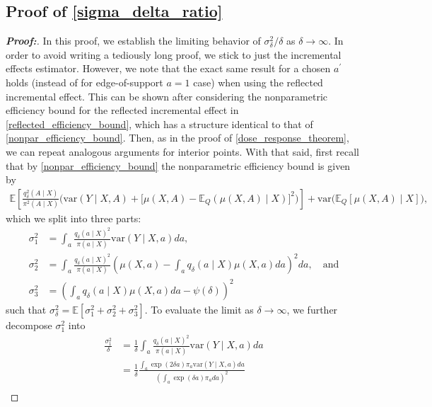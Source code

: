 \documentclass[11pt,twoside]{article}
\newcommand{\var}{\text{var}}
\theoremstyle{definition}
\theoremstyle{remark}
\begin{document}
\subsection{Proof of \texorpdfstring{\cref{sigma_delta_ratio}}{Corollary 1}} \label{sigma_delta_ratio_proof}
\begin{proof}[\textbf{Proof:}]
In this proof, we establish the limiting behavior of $\sigma^2_\delta / \delta$ as $\delta \to \infty$. In order to avoid writing a tediously long proof, we stick to just the incremental effects estimator. However, we note that the exact same result for a chosen $a^\prime$ holds (instead of for edge-of-support $a = 1$ case) when using the reflected incremental effect. This can be shown after considering the nonparametric efficiency bound for the reflected incremental effect in \cref{reflected_efficiency_bound}, which has a structure identical to that of \cref{nonpar_efficiency_bound}. Then, as in the proof of \cref{dose_response_theorem}, we can repeat analogous arguments for interior points. With that said, first recall that by \cref{nonpar_efficiency_bound} the nonparametric efficiency bound is given by
 \begin{align*}
     \mathbb{E}\left[\frac{q^2_\delta(A \mid X)}{\pi^2(A \mid X)} \Big( \var\left( Y \mid X, A \right) +  \big[ \mu(X, A) - \mathbb{E}_Q(\mu(X, A) \mid X) \big]^2 \Big) \right] + \var\Big( \mathbb{E}_Q\left[\mu(X, A) \mid X \right] \Big),
\end{align*}
which we split into three parts:
\begin{align*}
    \sigma_1^2 &= \int_a \frac{q_\delta(a \mid X)^2}{\pi(a \mid X)} \var\left( Y \mid X, a \right) da, \\
    \sigma_2^2 &= \int_a \frac{q_\delta(a \mid X)^2}{\pi(a \mid X)}\left( \mu(X, a) - \int_a q_\delta(a \mid X) \mu(X, a)da \right)^2 da, \quad \text{and}\\
    \sigma_3^2 &= \left(\int_a q_\delta(a \mid X) \mu(X, a)da  - \psi(\delta) \right)^2
\end{align*}
such that $\sigma^2_\delta = \mathbb{E}\left[\sigma_1^2 + \sigma_2^2 + \sigma_3^2 \right]$. To evaluate the limit as $\delta \to \infty$, we further decompose $\sigma^2_1$ into
\begin{align*}
    \frac{\sigma^2_1}{\delta} &= \frac{1}{\delta} \int_a \frac{q_\delta(a \mid X)^2}{\pi(a \mid X)} \var\left( Y \mid X, a \right) da \\
    &= \frac{1}{\delta} \frac{\int_a \exp(2 \delta a) \pi_a \var\left( Y \mid X, a \right) da}{\left(\int_a \exp(\delta a) \pi_a da \right)^2} \\

\end{align*}
\end{proof}
\end{document}
